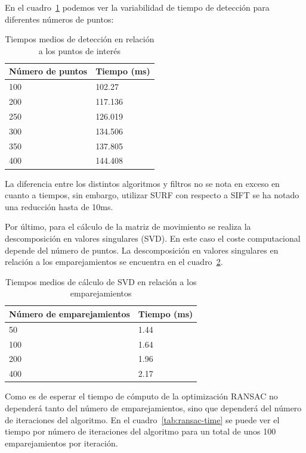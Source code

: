 En el cuadro~\ref{tab:detection-time} podemos ver la variabilidad de tiempo de detección para diferentes números de puntos:

\begin{table}
\caption{Tiempos medios de detección en relación a los puntos de interés}
\label{tab:detection-time}
\centering
\begin{tabular}{ l | l }
\toprule
\textbf{Número de puntos} & \textbf{Tiempo (ms)}\\
\hline\hline
100 & 102.27\\
\hline
200 & 117.136\\
\hline
250 & 126.019\\
\hline
300 & 134.506\\
\hline
350 & 137.805\\
\hline
400 & 144.408\\
\bottomrule
\end{tabular}
\end{table}


La diferencia entre los distintos algoritmos y filtros no se nota en exceso en cuanto a tiempos, sin embargo, utilizar SURF con respecto a SIFT se ha notado una reducción hasta de 10ms.

Por último, para el cálculo de la matriz de movimiento se realiza la descomposición en valores singulares (SVD). En este caso el coste computacional depende del número de puntos. La descomposición en valores singulares en relación a los emparejamientos se encuentra en el cuadro~\ref{tab:svd-time}.

\begin{table}
\caption{Tiempos medios de cálculo de SVD en relación a los emparejamientos}
\label{tab:svd-time}
\centering
\begin{tabular}{ l | l }
\toprule
\textbf{Número de emparejamientos} & \textbf{Tiempo (ms)}\\
\hline\hline
50 & 1.44\\
\hline
100 & 1.64\\
\hline
200 & 1.96\\
\hline
400 & 2.17\\
\bottomrule
\end{tabular}
\end{table}

Como es de esperar el tiempo de cómputo de la optimización RANSAC no dependerá tanto del número de emparejamientos, sino que dependerá del número de iteraciones del algoritmo. En el cuadro~\ref{tab:ransac-time} se puede ver el tiempo por número de iteraciones del algoritmo para un total de unos 100 emparejamientos por iteración.

